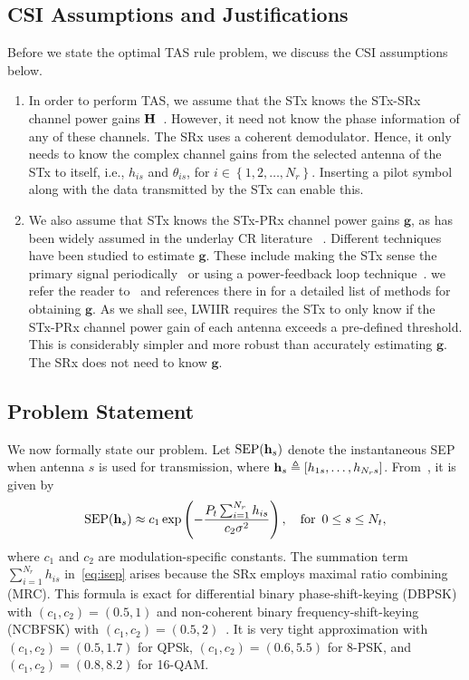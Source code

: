 \documentclass[12pt,draftcls,peerreview,onecolumn]{IEEEtran}
\newcommand{\define}{\triangleq}
\newcommand{\ie}{{i.e.}}
\newcommand{\mtx}[1]{{\bf #1}} %
\newcommand{\SEP}{\text{SEP}}
\newcommand{\Nt}{{N_t}}
\newcommand{\Nr}{{N_r}}
\newcommand{\Pt}{{P_t}}
\newcommand{\such}{h}
\newcommand{\puch}{g}
\newcommand{\hk}[1]{{\such_{#1}}}
\newcommand{\g}{\mathbf{\puch}}
\newcommand{\noisevar}{\sigma^2}
\newcommand{\cone}{c_{1}}
\newcommand{\ctwo}{c_{2}}
\newcommand{\nropts}{\left\{1,2,\ldots,\Nr\right\}}
\newcommand{\suchph}{\theta}
\newcommand{\thetahk}{\suchph_{is}}
\newcommand{\Hmx}{\mtx{H}}
\newcommand{\sumnr}{\sum_{i=1}^{\Nr}}
\begin{document}
\subsection{CSI Assumptions and Justifications}  
Before we state the optimal TAS rule problem, we discuss the  CSI assumptions below. 
\begin{enumerate}
\item In order to perform TAS, we assume that the STx knows the STx-SRx channel power gains $\Hmx$~\cite{Hanif_2015_globecom,Sarvendranath_2013_TCOM,Wang_2010_TWC,RZhang_2009_TWC,Sarvendranath_2014_TCOM}. However, it need not know the phase information of any of these channels. The SRx uses a coherent demodulator. Hence, it only needs to know the complex channel gains from the selected antenna of the STx to itself, \ie, $\hk{is}$ and $\thetahk$, for $i\in\nropts$. Inserting a pilot symbol along with the data transmitted by the STx can enable this.  

\item We also assume that STx knows the STx-PRx channel power gains $\g$, as has been widely assumed in the underlay CR literature ~\cite{Hanif_2015_globecom,Sarvendranath_2013_TCOM,Sarvendranath_2014_TCOM,Kong_2011_JCN,Wang_2010_TWC,RZhang_2009_TWC}. Different techniques have been studied to estimate  $\g$. These include making the STx sense the primary signal periodically~\cite{Zhao_2008_TSP} or using a power-feedback loop technique~\cite{RZhang_2008_DSAN}. we refer the reader to~\cite{Zhang_2017_tcom} and references there in for a detailed list of methods for obtaining $\g$.  As we shall see, LWIIR  requires the STx to only know if the STx-PRx channel power gain of each antenna exceeds a pre-defined threshold. This is considerably simpler and more robust than accurately estimating $\g$. The SRx does not need to know $\g$. 

\end{enumerate}

\subsection{Problem Statement}
We now formally state our problem. Let $\SEP(\hs)$ denote the instantaneous SEP when antenna $s$ is used for transmission, where $\hs\define\left[\hk{1s},\ldots,\hk{\Nr s} \right]$. From~\cite[(14)]{Chung_2001_TCom}, it is given by  
\begin{equation}
\SEP(\hs) \approx \cone \exp\left({-\frac{\Pt\sumnr\hk{is}}{\ctwo\noisevar} }\right), \quad\text{for} \,\,\, 0\leq s \leq \Nt,
\label{eq:isep}
\end{equation} 
where $\cone$ and $\ctwo$ are modulation-specific constants. The summation term $\sumnr\hk{is}$ in~\eqref{eq:isep} arises because the SRx employs maximal ratio combining (MRC). This formula is exact for differential binary phase-shift-keying (DBPSK) with $(\cone,\ctwo) = (0.5,1)$  and non-coherent binary frequency-shift-keying (NCBFSK) with  $(\cone,\ctwo) = (0.5,2)$~\cite{Fakhan_2014_TSP}. It is very tight approximation with $(\cone,\ctwo )=(0.5,1.7)$ for QPSk,  $(\cone,\ctwo)=(0.6,5.5)$ for 8-PSK, and  $(\cone,\ctwo )=(0.8,8.2)$ for 16-QAM. %
\end{document}
